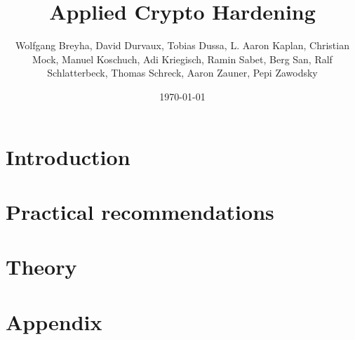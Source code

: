 \documentclass[	DIV=calc,%
				paper=a4,%
				fontsize=9pt,%
				onecolumn]{scrreprt}	 					%
\title{Applied Crypto Hardening}%
\author{Wolfgang Breyha, David Durvaux, Tobias Dussa, L. Aaron
					Kaplan, Christian Mock, Manuel Koschuch, Adi
					Kriegisch, Ramin Sabet, Berg San, Ralf Schlatterbeck, Thomas Schreck, Aaron Zauner, Pepi Zawodsky}
\date{\today}
\newcommand{\initial}[1]{%
     \lettrine[lines=3,lhang=0.3,nindent=0em]{
     				\color{DarkGoldenrod}
     				{\textsf{#1}}}{}}
\begin{document}
\maketitle

\thispagestyle{fancy} 			%


\tableofcontents
\chapter{Introduction}




\chapter{Practical recommendations}

\chapter{Theory}







\chapter{Appendix}








\end{document}
